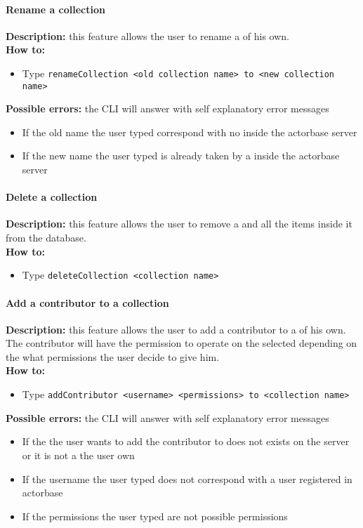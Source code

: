 \documentclass{scalatekids-article}
\begin{document}
\paragraph{Rename a collection}
\label{sec:renamecollection}
\textbf{Description:} this feature allows the user to rename a
 of his own.\\
\textbf{How to:}
\begin{itemize}
\item Type \texttt{renameCollection <old collection name> to <new collection name>}
\end{itemize}
\textbf{Possible errors:} the CLI will answer with self explanatory error messages
\begin{itemize}
\item If the old  name the user typed correspond with no  inside the actorbase server
\item If the new  name the user typed is already taken by a  inside the actorbase server
\end{itemize}

\paragraph{Delete a collection}
\label{sec:deletecollection}
\textbf{Description:} this feature allows the user to remove a  and all the items inside it from the database.\\
\textbf{How to:}
\begin{itemize}
\item Type \texttt{deleteCollection <collection name>}
\end{itemize}

\paragraph{Add a contributor to a collection}
\label{sec:addcontributor}
\textbf{Description:} this feature allows the user to add a contributor
to a  of his own. The contributor will have the permission to operate on the selected  depending on the what permissions the user decide to give him.\\
\textbf{How to:}
\begin{itemize}
\item Type \texttt{addContributor <username> <permissions> to <collection name>}
\end{itemize}
\textbf{Possible errors:} the CLI will answer with self explanatory error messages
\begin{itemize}
\item If the  the user wants to add the contributor to does not exists on the server or it is not a  the user own
\item If the username the user typed does not correspond with a user registered in actorbase
\item If the permissions the user typed are not possible permissions
\end{itemize}
\end{document}
